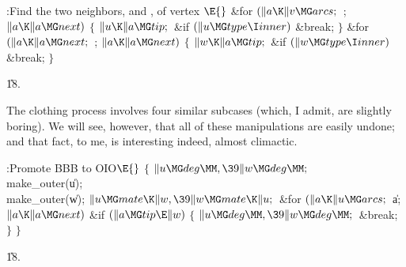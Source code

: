 \B{}:Find the two neighbors,  and , of vertex %
\X${}\E{}$\6
\&{for} ${}(\|a\K\|v\MG\\{arcs};{}$  ; ${}\|a\K\|a\MG\\{next}){}$\5
${}\{{}$\1\6
${}\|u\K\|a\MG\\{tip};{}$\6
\&{if} ${}(\|u\MG\\{type}\I\\{inner}){}$\1\5
\&{break};\2\6
\4${}\}{}$\2\6
\&{for} ${}(\|a\K\|a\MG\\{next};{}$  ; ${}\|a\K\|a\MG\\{next}){}$\5
${}\{{}$\1\6
${}\|w\K\|a\MG\\{tip};{}$\6
\&{if} ${}(\|w\MG\\{type}\I\\{inner}){}$\1\5
\&{break};\2\6
\4${}\}{}$\2\par
\U18.\fi

The clothing process involves four similar subcases (which, I admit,
are slightly boring). We will see, however, that all of these manipulations
are easily undone; and that fact, to me, is interesting indeed, almost
climactic.

\Y\B\4:Promote BBB to OIO\X${}\E{}$\6
${}\{{}$\1\6
${}\|u\MG\\{deg}\MM,\39\|w\MG\\{deg}\MM;{}$\6
\\{make\_outer}(\|u);\6
\\{make\_outer}(\|w);\6
${}\|u\MG\\{mate}\K\|w,\39\|w\MG\\{mate}\K\|u;{}$\6
\&{for} ${}(\|a\K\|u\MG\\{arcs};{}$ \|a; ${}\|a\K\|a\MG\\{next}){}$\1\6
\&{if} ${}(\|a\MG\\{tip}\E\|w){}$\5
${}\{{}$\1\6
${}\|u\MG\\{deg}\MM,\39\|w\MG\\{deg}\MM;{}$\6
\&{break};\6
\4${}\}{}$\2\2\6
\4${}\}{}$\2\par
\U18.\fi

